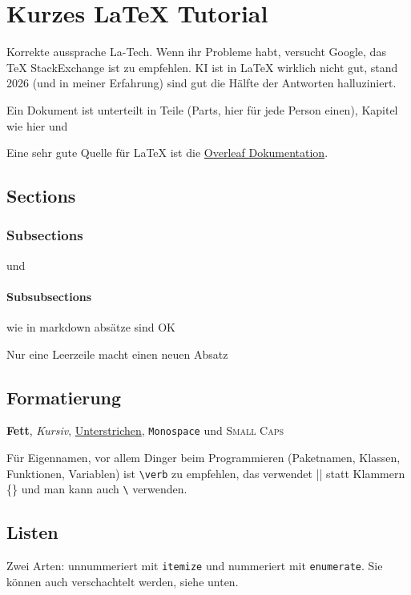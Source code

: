 \chapter{Kurzes \LaTeX{} Tutorial}\label{chap:1-intro}

Korrekte aussprache La-Tech. Wenn ihr Probleme habt, versucht Google, das TeX StackExchange ist zu empfehlen. KI ist in LaTeX wirklich nicht gut, stand 2026 (und in meiner Erfahrung) sind gut die Hälfte der Antworten halluziniert.

Ein Dokument ist unterteilt in Teile (Parts, hier für jede Person einen), Kapitel wie hier und

Eine sehr gute Quelle für \LaTeX{} ist die \href{https://www.overleaf.com/learn/latex}{Overleaf Dokumentation}.

\section{Sections}

\subsection{Subsections}

und

\subsubsection{Subsubsections}

wie in markdown
absätze sind OK

Nur eine Leerzeile macht einen neuen Absatz

\section{Formatierung}

\textbf{Fett}, \textit{Kursiv}, \underline{Unterstrichen}, \texttt{Monospace} und \textsc{Small Caps}

Für Eigennamen, vor allem Dinger beim Programmieren (Paketnamen, Klassen, Funktionen, Variablen) ist \verb|\verb| zu empfehlen, das verwendet || statt Klammern \{\} und man kann auch \verb|\| verwenden.

\section{Listen}

Zwei Arten: unnummeriert mit \verb|itemize| und nummeriert mit \verb|enumerate|. Sie können auch verschachtelt werden, siehe unten.

